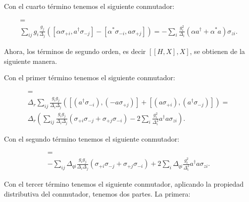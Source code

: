 Con el cuarto término tenemos el siguiente conmutador:

\begin{multline}
[\sum\limits_i g_i (\alpha \sigma_{+i} + \alpha^* \sigma_{-i}), \sum\limits_i \frac{g_i} {\Delta_i} (a^\dagger \sigma_{-i} - a \sigma_{+i})] =\\
\sum\limits_{ij} g_i \frac{g_j} {\Delta_j} \left([\alpha \sigma_{+i}, a^\dagger \sigma_{-j}] - [\alpha^* \sigma_{-i}, a \sigma_{+j}]\right) =
- \sum\limits_i \frac{g_i^2} {\Delta_i} (\alpha a^\dagger + \alpha^* a) \sigma_{zi} .
\end{multline}

Ahora, los términos de segundo orden, es decir $[[H,X],X]$, se obtienen de la siguiente manera.

Con el primer término tenemos el siguiente conmutador:

\begin{multline}
    [\Delta_r \sum\limits_i \frac{g_i} {\Delta_i} (a^\dagger \sigma_{-i} + a \sigma_{+i}), \sum\limits_j \frac{g_j} {\Delta_j} (a^\dagger \sigma_{-j} - a \sigma_{+j})] = \\
    \Delta_r \sum\limits_{ij} \frac{g_i g_j}{\Delta_i \Delta_j} \left([(a^\dagger \sigma_{-i} ), (- a \sigma_{+j})] + 
        [(a \sigma_{+i}), (a^\dagger \sigma_{-j} )]\right) = \\
\Delta_r \left(\sum\limits_{ij} \frac{g_i g_j}{\Delta_i \Delta_j} \left(\sigma_{+i} \sigma_{-j} + \sigma_{+j} \sigma_{-i}\right) -
2 \sum\limits_{i} \frac{g_i^2}{\Delta_i^2} a^\dagger a \sigma_{zi} \right) .
\end{multline}

Con el segundo término tenemos el siguiente conmutador:

\begin{multline}
    [- \sum\limits_i \frac{g_i} {\Delta_i} \Delta_{qi} (a^\dagger \sigma_{-i} + a \sigma_{+i}), \sum\limits_j \frac{g_j} {\Delta_j} (a^\dagger \sigma_{-j} - a \sigma_{+j})] = \\
- \sum\limits_{ij} \Delta_{qi}  \frac{g_i g_j}{\Delta_i \Delta_j} \left(\sigma_{+i} \sigma_{-j} + \sigma_{+j} \sigma_{-i}\right) +
2 \sum\limits_{i} \Delta_{qi} \frac{g_i^2}{\Delta_i^2} a^\dagger a \sigma_{zi} .
\end{multline}

Con el tercer término tenemos el siguiente conmutador, aplicando la propiedad distributiva del conmutador, tenemos dos partes. La primera:

